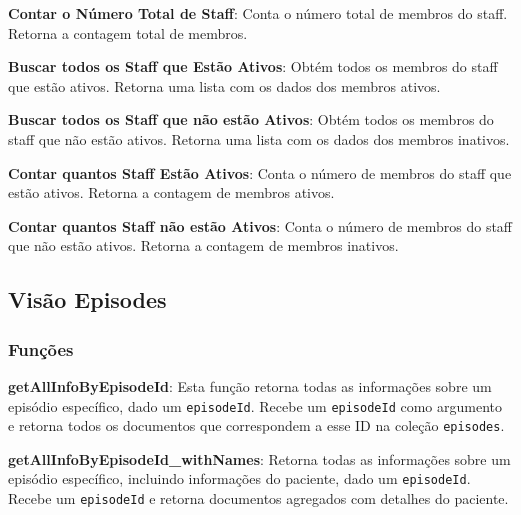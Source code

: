 \vspace{0.15cm}

\textbf{Contar o Número Total de Staff}: Conta o número total de membros do staff. Retorna a contagem total de membros.

\vspace{0.15cm}

\textbf{Buscar todos os Staff que Estão Ativos}: Obtém todos os membros do staff que estão ativos. Retorna uma lista com os dados dos membros ativos.

\vspace{0.15cm}

\textbf{Buscar todos os Staff que não estão Ativos}: Obtém todos os membros do staff que não estão ativos. Retorna uma lista com os dados dos membros inativos.

\vspace{0.15cm}

\textbf{Contar quantos Staff Estão Ativos}: Conta o número de membros do staff que estão ativos. Retorna a contagem de membros ativos.

\vspace{0.15cm}

\textbf{Contar quantos Staff não estão Ativos}: Conta o número de membros do staff que não estão ativos. Retorna a contagem de membros inativos.

\subsection{Visão Episodes}

\subsubsection{Funções}

\vspace{0.15cm}

\textbf{getAllInfoByEpisodeId}: Esta função retorna todas as informações sobre um episódio específico, dado um \texttt{episodeId}. Recebe um \texttt{episodeId} como argumento e retorna todos os documentos que correspondem a esse ID na coleção \texttt{episodes}.

\vspace{0.15cm}

\textbf{getAllInfoByEpisodeId\_withNames}: Retorna todas as informações sobre um episódio específico, incluindo informações do paciente, dado um \texttt{episodeId}. Recebe um \texttt{episodeId} e retorna documentos agregados com detalhes do paciente.

